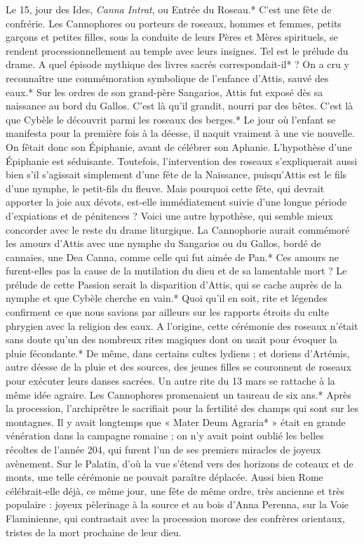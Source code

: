 \documentclass[a4paper, 11pt, oneside, polutonikogreek, french]{article}
\begin{document}
Le 15, jour des Ides, \emph{Canna Intrat}, ou Entrée du Roseau.* C'est une fête de confrérie. Les Cannophores ou porteurs de roseaux, hommes et femmes, petits garçons et petites filles, sous la conduite de leurs Pères et Mères spirituels, se rendent processionnellement au temple avec leurs insignes. Tel est le prélude du drame. A quel épisode mythique des livres sacrés correspondait-il* ? On a cru y reconnaître une commémoration symbolique de l'enfance d'Attis, sauvé des eaux.* Sur les ordres de son grand-père Sangarios, Attis fut exposé dès sa naissance au bord du Gallos. C'est là qu'il grandit, nourri par des bêtes. C'est là que Cybèle le découvrit parmi les roseaux des berges.* Le jour où l'enfant se manifesta pour la première fois à la déesse, il naquit vraiment à une vie nouvelle. On fêtait donc son Épiphanie, avant de célébrer son Aphanie. L'hypothèse d'une Épiphanie est séduisante. Toutefois, l'intervention des roseaux s'expliquerait aussi bien s'il s'agissait simplement d'une fête de la Naissance, puisqu'Attis est le fils d'une nymphe, le petit-fils du fleuve. Mais pourquoi cette fête, qui devrait apporter la joie aux dévots, est-elle immédiatement suivie d'une longue période d'expiations et de pénitences ? Voici une autre hypothèse, qui semble mieux concorder avec le reste du drame liturgique. La Cannophorie aurait commémoré les amours d'Attis avec une nymphe du Sangarios ou du Gallos, bordé de cannaies, une Dea Canna, comme celle qui fut aimée de Pan.* Ces amours ne furent-elles pas la cause de la mutilation du dieu et de sa lamentable mort ? Le prélude de cette Passion serait la disparition d'Attis, qui se cache auprès de la nymphe et que Cybèle cherche en vain.* Quoi qu'il en soit, rite et légendes confirment ce que nous savions par ailleurs sur les rapports étroits du culte phrygien avec la religion des eaux. A l'origine, cette cérémonie des roseaux n'était sans doute qu'un des nombreux rites magiques dont on usait pour évoquer la pluie fécondante.* De même, dans certains cultes lydiens ; et doriens d'Artémis, autre déesse de la pluie et des sources, des jeunes filles se couronnent de roseaux pour exécuter leurs danses sacrées. Un autre rite du 13 mars se rattache à la même idée agraire. Les Cannophores promenaient un taureau de six ans.* Après la procession, l'archiprêtre le sacrifiait pour la fertilité des champs qui sont sur les montagnes. Il y avait longtemps que « Mater Deum Agraria* » était en grande vénération dans la campagne romaine ; on n'y avait point oublié les belles récoltes de l'année 204, qui furent l'un de ses premiers miracles de joyeux avènement. Sur le Palatin, d'où la vue s'étend vers des horizons de coteaux et de monts, une telle cérémonie ne pouvait paraître déplacée. Aussi bien Rome célébrait-elle déjà, ce même jour, une fête de même ordre, très ancienne et très populaire : joyeux pèlerinage à la source et au bois d'Anna Perenna, sur la Voie Flaminienne, qui contrastait avec la procession morose des confrères orientaux, tristes de la mort prochaine de leur dieu.
\end{document}
